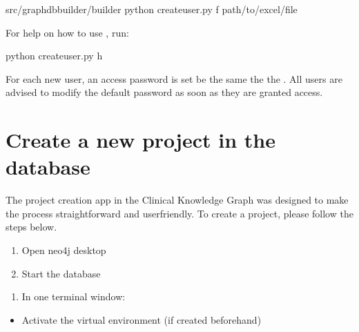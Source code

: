 \documentclass[letterpaper,10pt,english]{sphinxmanual}
\begin{document}
 

\begin{sphinxVerbatim}[commandchars=\\\{\}]
\PYGZdl{}  src/graphdb\PYGZus{}builder/builder
\PYGZdl{} python create\PYGZus{}user.py \PYGZhy{}f path/to/excel/file
\end{sphinxVerbatim}

For help on how to use , run:

\begin{sphinxVerbatim}[commandchars=\\\{\}]
\PYGZdl{} python create\PYGZus{}user.py \PYGZhy{}h
\end{sphinxVerbatim}

For each new user, an access password is set be the same the the . All users are advised
to modify the default password as soon as they are granted access.


\section{Create a new project in the database}
\label{\detokenize{getting_started/create-new-project:create-a-new-project-in-the-database}}\label{\detokenize{getting_started/create-new-project::doc}}
The project creation app in the Clinical Knowledge Graph was designed to make the process straightforward and user\sphinxhyphen{}friendly.
To create a project, please follow the steps below.

\begin{enumerate}
%
\item {} 
Open neo4j desktop

\item {} 
Start the database

\end{enumerate}

\begin{enumerate}
%
\item {} 
In one terminal window:

\end{enumerate}
\begin{itemize}
\item {} 
Activate the virtual environment (if created beforehand)

\end{itemize}
\end{document}
